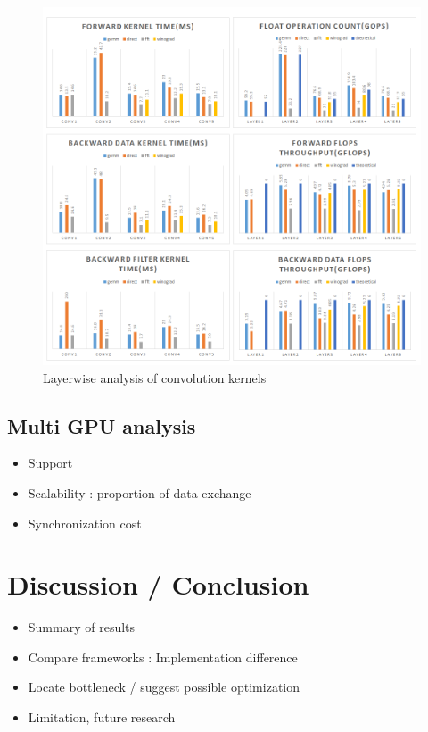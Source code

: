 \begin{figure}
  \centering
  \includegraphics[width=\linewidth]{./figures/layerwise_bench}
  \caption{Layerwise analysis of convolution kernels}
  \label{fig_layerwise}
\end{figure}

\subsection{Multi GPU analysis}

\begin{itemize}
  \item Support
  \item Scalability : proportion of data exchange
  \item Synchronization cost
\end{itemize}

\section{Discussion / Conclusion}

\begin{itemize}
  \item Summary of results
  \item Compare frameworks : Implementation difference
  \item Locate bottleneck / suggest possible optimization
  \item Limitation, future research
\end{itemize}
